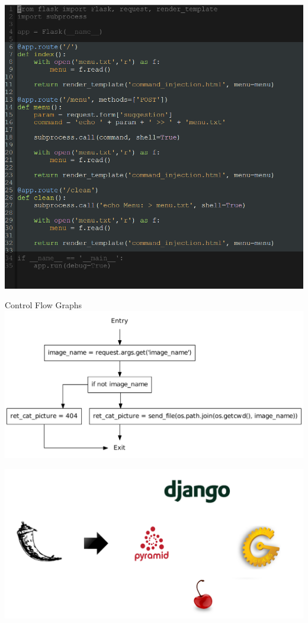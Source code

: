 \begin{frame}
  \includegraphics[height=0.8\textheight]{graphics/adaptor_flask}
\end{frame}


\begin{frame}{Control Flow Graphs}
  \center
  \includegraphics[height=0.75\textheight]{graphics/CFG_path_traversal}
\end{frame}



\begin{frame}
  \center
  \includegraphics[width=\textwidth]{graphics/adaptor}
\end{frame}
